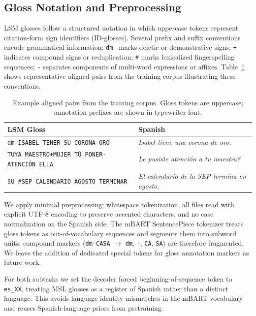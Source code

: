\documentclass[sigconf,screen]{ceurart}
\begin{document}
\subsection{Gloss Notation and Preprocessing}

LSM glosses follow a structured notation in which uppercase tokens
represent citation-form sign identifiers (ID-glosses).
Several prefix and suffix conventions encode grammatical information:
\texttt{dm-} marks deictic or demonstrative signs;
\texttt{+} indicates compound signs or reduplication;
\texttt{\#} marks lexicalized fingerspelling sequences;
\texttt{-} separates components of multi-word expressions or affixes.
Table~\ref{tab:examples} shows representative aligned pairs from the
training corpus illustrating these conventions.

\begin{table}[h]
\centering
\small
\caption{Example aligned pairs from the training corpus. Gloss tokens
are uppercase; annotation prefixes are shown in typewriter font.}
\label{tab:examples}
\begin{tabular}{p{5.5cm}p{6.5cm}}
\toprule
\textbf{LSM Gloss} & \textbf{Spanish} \\
\midrule
\texttt{dm-ISABEL TENER SU CORONA ORO} &
  \textit{Isabel tiene una corona de oro.} \\
\texttt{TUYA MAESTRO+MUJER T\'U PONER-ATENCI\'ON ELLA} &
  \textit{Le pusiste atenci\'on a tu maestra?} \\
\texttt{SU \#SEP CALENDARIO AGOSTO TERMINAR} &
  \textit{El calendario de la SEP termina en agosto.} \\
\bottomrule
\end{tabular}
\end{table}

We apply minimal preprocessing: whitespace tokenization, all files
read with explicit UTF-8 encoding to preserve accented characters,
and no case normalization on the Spanish side.
The mBART SentencePiece tokenizer treats gloss tokens as
out-of-vocabulary sequences and segments them into subword units;
compound markers (\texttt{dm-CASA} $\to$ \texttt{dm}, \texttt{-},
\texttt{CA}, \texttt{SA}) are therefore fragmented.
We leave the addition of dedicated special tokens for gloss annotation
markers as future work.

For both subtasks we set the decoder forced beginning-of-sequence
token to \texttt{es\_XX}, treating MSL glosses as a register of
Spanish rather than a distinct language.
This avoids language-identity mismatches in the mBART vocabulary and
reuses Spanish-language priors from pretraining.
\end{document}
